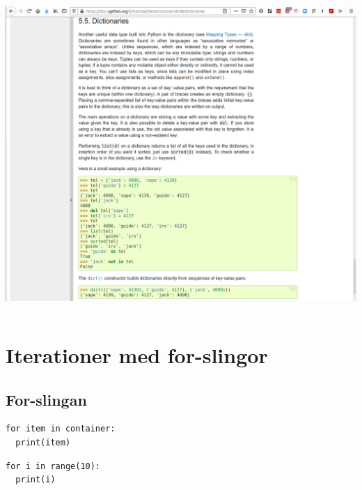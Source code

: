 \begin{frame}
  \includegraphics[width=\columnwidth]{figs/docs-dicts.png}
\end{frame}

\begin{frame}[fragile]
  \begin{example}[phone.py]
    \inputminted{python}{examples/phone.py}
  \end{example}
\end{frame}


\section{Iterationer med for-slingor}

\subsection{For-slingan}

\begin{frame}[fragile]
  \begin{verbatim}
for item in container:
  print(item)
  \end{verbatim}
\end{frame}

\begin{frame}[fragile]
  \begin{example}
    \begin{verbatim}
for i in range(10):
  print(i)
    \end{verbatim}
  \end{example}
\end{frame}

